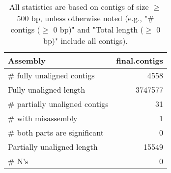 \documentclass[12pt,a4paper]{article}
\begin{document}
\begin{table}[ht]
\begin{center}
\caption{All statistics are based on contigs of size $\geq$ 500 bp, unless otherwise noted (e.g., "\# contigs ($\geq$ 0 bp)" and "Total length ($\geq$ 0 bp)" include all contigs).}
\begin{tabular}{|l*{1}{|r}|}
\hline
Assembly & final.contigs \\ \hline
\# fully unaligned contigs & 4558 \\ \hline
Fully unaligned length & 3747577 \\ \hline
\# partially unaligned contigs & 31 \\ \hline
\hspace{5mm}\# with misassembly & 1 \\ \hline
\hspace{5mm}\# both parts are significant & 0 \\ \hline
Partially unaligned length & 15549 \\ \hline
\# N's & 0 \\ \hline
\end{tabular}
\end{center}
\end{table}
\end{document}
